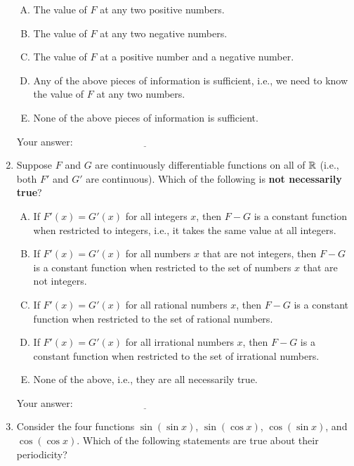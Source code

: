 \documentclass[10pt]{amsart}
\begin{document}
\begin{enumerate}
  \begin{enumerate}[(A)]
  \item The value of $F$ at any two positive numbers.
  \item The value of $F$ at any two negative numbers.
  \item The value of $F$ at a positive number and a negative number.
  \item Any of the above pieces of information is sufficient, i.e., we
    need to know the value of $F$ at any two numbers.
  \item None of the above pieces of information is sufficient.
  \end{enumerate}

  \vspace{0.05in}
  Your answer: $\underline{\qquad\qquad\qquad\qquad\qquad\qquad\qquad}$
  \vspace{0.05in}

\item Suppose $F$ and $G$ are continuously differentiable functions on
  all of $\mathbb{R}$ (i.e., both $F'$ and $G'$ are continuous). Which of the
  following is {\bf not necessarily true}? 

  \begin{enumerate}[(A)]
  \item If $F'(x) = G'(x)$ for all integers $x$, then $F - G$ is a
    constant function when restricted to integers, i.e., it takes the
    same value at all integers.
  \item If $F'(x) = G'(x)$ for all numbers $x$ that are not integers,
    then $F - G$ is a constant function when restricted to the set of
    numbers $x$ that are not integers.
  \item If $F'(x) = G'(x)$ for all rational numbers $x$, then $F - G$
    is a constant function when restricted to the set of rational
    numbers.
  \item If $F'(x) = G'(x)$ for all irrational numbers $x$, then $F -
    G$ is a constant function when restricted to the set of irrational
    numbers.
  \item None of the above, i.e., they are all necessarily true.
  \end{enumerate}
  
  \vspace{0.05in}
  Your answer: $\underline{\qquad\qquad\qquad\qquad\qquad\qquad\qquad}$
  \vspace{0.05in}
  
\item Consider the four functions $\sin(\sin x)$, $\sin(\cos x)$,
  $\cos(\sin x)$, and $\cos(\cos x)$. Which of the following
  statements are true about their periodicity? 


\end{enumerate}
\end{document}
